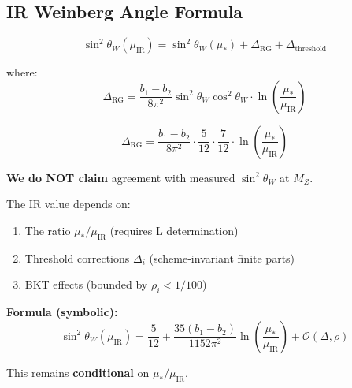 \documentclass[11pt,a4paper]{article}
\theoremstyle{definition}
\begin{document}
\subsection{IR Weinberg Angle Formula}
\label{subsec:sw2_ir}

\begin{equation}
\label{eq:sw2_ir}
\sin^2\theta_W(\mu_{\text{IR}}) = \sin^2\theta_W(\mu_*) + \Delta_{\text{RG}} + \Delta_{\text{threshold}}
\end{equation}

where:
\begin{equation}
\label{eq:Delta_RG}
\Delta_{\text{RG}} = \frac{b_1 - b_2}{8\pi^2}\sin^2\theta_W\cos^2\theta_W \cdot \ln\left(\frac{\mu_*}{\mu_{\text{IR}}}\right)
\end{equation}

\begin{equation}
\label{eq:Delta_RG_explicit}
\Delta_{\text{RG}} = \frac{b_1 - b_2}{8\pi^2} \cdot \frac{5}{12} \cdot \frac{7}{12} \cdot \ln\left(\frac{\mu_*}{\mu_{\text{IR}}}\right)
\end{equation}

\begin{conditionalbox}
\textbf{We do NOT claim} agreement with measured $\sin^2\theta_W$ at $M_Z$.

The IR value depends on:
\begin{enumerate}
\item The ratio $\mu_*/\mu_{\text{IR}}$ (requires L determination)
\item Threshold corrections $\Delta_i$ (scheme-invariant finite parts)
\item BKT effects (bounded by $\rho_i < 1/100$)
\end{enumerate}

\textbf{Formula (symbolic):}
\begin{equation}
\label{eq:sw2_ir_symbolic}
\sin^2\theta_W(\mu_{\text{IR}}) = \frac{5}{12} + \frac{35(b_1 - b_2)}{1152\pi^2}\ln\left(\frac{\mu_*}{\mu_{\text{IR}}}\right) + \mathcal{O}(\Delta, \rho)
\end{equation}

This remains \textbf{conditional} on $\mu_*/\mu_{\text{IR}}$.
\end{conditionalbox}

\end{document}
